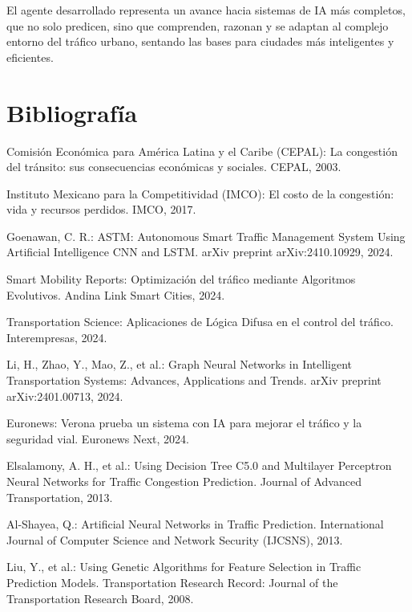 \documentclass{svproc} %
\begin{document}
El agente desarrollado representa un avance hacia sistemas de IA más completos, que no solo predicen, sino que comprenden, razonan y se adaptan al complejo entorno del tráfico urbano, sentando las bases para ciudades más inteligentes y eficientes.


\section{Bibliografía}
\begin{thebibliography}{99}

     Comisión Económica para América Latina y el Caribe (CEPAL): La congestión del tránsito: sus consecuencias económicas y sociales. CEPAL, 2003.

     Instituto Mexicano para la Competitividad (IMCO): El costo de la congestión: vida y recursos perdidos. IMCO, 2017.

     Goenawan, C. R.: ASTM: Autonomous Smart Traffic Management System Using Artificial Intelligence CNN and LSTM. arXiv preprint arXiv:2410.10929, 2024.
    
     Smart Mobility Reports: Optimización del tráfico mediante Algoritmos Evolutivos. Andina Link Smart Cities, 2024.
    
     Transportation Science: Aplicaciones de Lógica Difusa en el control del tráfico. Interempresas, 2024.
  
     Li, H., Zhao, Y., Mao, Z., et al.: Graph Neural Networks in Intelligent Transportation Systems: Advances, Applications and Trends. arXiv preprint arXiv:2401.00713, 2024.

     Euronews: Verona prueba un sistema con IA para mejorar el tráfico y la seguridad vial. Euronews Next, 2024.
  
     Elsalamony, A. H., et al.: Using Decision Tree C5.0 and Multilayer Perceptron Neural Networks for Traffic Congestion Prediction. Journal of Advanced Transportation, 2013.
    
     Al-Shayea, Q.: Artificial Neural Networks in Traffic Prediction. International Journal of Computer Science and Network Security (IJCSNS), 2013.
    
     Liu, Y., et al.: Using Genetic Algorithms for Feature Selection in Traffic Prediction Models. Transportation Research Record: Journal of the Transportation Research Board, 2008.
    

\end{thebibliography}
\end{document}
